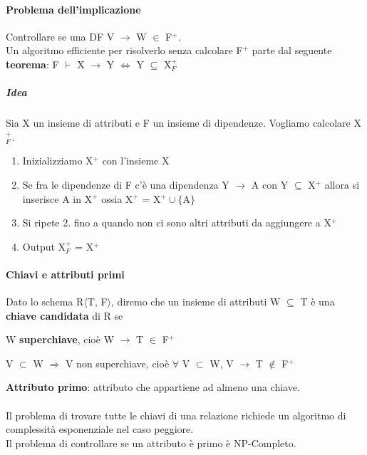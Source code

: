 \documentclass[10pt]{book}
\begin{document}
\paragraph{Problema dell'implicazione} Controllare se una DF V $\rightarrow$ W $\in$ F$^+$.\\
Un algoritmo efficiente per risolverlo senza calcolare F$^+$ parte dal seguente \textbf{teorema}: F $\vdash$ X $\rightarrow$ Y $\Leftrightarrow$ Y $\subseteq$ X$_F^+$
\subparagraph{Idea} Sia X un insieme di attributi e F un insieme di dipendenze. Vogliamo calcolare X$_F^+$.
\begin{enumerate}
	\item Inizializziamo X$^+$ con l'insieme X
	\item Se fra le dipendenze di F c'è una dipendenza Y $\rightarrow$ A con Y $\subseteq$ X$^+$ allora si inserisce A in X$^+$ ossia X$^+$ = X$^+\cup\{$A$\}$
	\item Si ripete 2. fino a quando non ci sono altri attributi da aggiungere a X$^+$
	\item Output X$_F^+$ = X$^+$
\end{enumerate}
\paragraph{Chiavi e attributi primi} Dato lo schema R$\langle$T, F$\rangle$, diremo che un insieme di attributi W $\subseteq$ T è una \textbf{chiave candidata} di R se
\begin{list}{}{}
	\item W \textbf{superchiave}, cioè W $\rightarrow$ T $\in$ F$^+$
	\item V $\subset$ W $\Rightarrow$ V non superchiave, cioè $\forall$ V $\subset$ W, V $\rightarrow$ T $\not\in$ F$^+$
\end{list}
\textbf{Attributo primo}: attributo che appartiene ad almeno una chiave.\\\\
Il problema di trovare tutte le chiavi di una relazione richiede un algoritmo di complessità esponenziale nel caso peggiore.\\
Il problema di controllare se un attributo è primo è NP-Completo.
\end{document}
